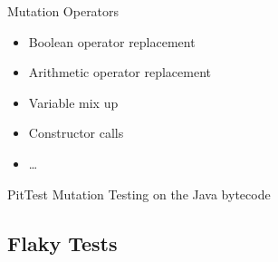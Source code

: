 \begin{frame}{\insertsubsection}
\begin{fancycolumns}[animation=none]
\begin{note}{Mutation Operators}
\begin{itemize}
				\item Boolean operator replacement
				\item Arithmetic operator replacement
				\item Variable mix up
				\item Constructor calls
				\item \dots
			\end{itemize}
		\end{note}\pause
		\begin{note}{PitTest}
			Mutation Testing on the Java bytecode
		\end{note}
	\end{fancycolumns}
\end{frame}

\subsection{Flaky Tests}
